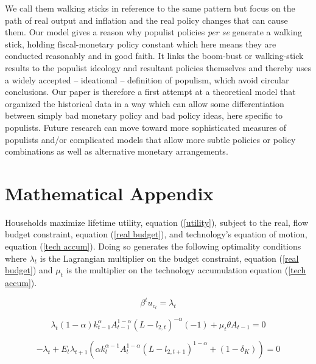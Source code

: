 \documentclass{OUP-EJ}
\begin{document}
We call them walking sticks in reference to the same pattern but focus on the path of real output and inflation and the real policy changes that can cause them. Our model gives a reason why populist policies \textit{per se} generate a walking stick, holding fiscal-monetary policy constant which here means they are conducted reasonably and in good faith. It links the boom-bust or walking-stick results to the populist ideology and resultant policies themselves and thereby uses a widely accepted – ideational – definition of populism, which avoid circular conclusions. Our paper is therefore a first attempt at a theoretical model that organized the historical data in a way which can allow some differentiation between simply bad monetary policy and bad policy ideas, here specific to populists.  Future research can move toward more sophisticated measures of populists and/or complicated models that allow more subtle policies or policy combinations as well as alternative monetary arrangements.




\appendix

\section{Mathematical Appendix}

Households maximize lifetime utility, equation (\ref{utility}), subject to the real, flow budget constraint, equation (\ref{real budget}), and technology's equation of motion, equation (\ref{tech accum}).  Doing so generates the following optimality conditions where $\lambda_t$ is the Lagrangian multiplier on the budget constraint, equation (\ref{real budget}) and $\mu_t$ is the multiplier on the technology accumulation equation (\ref{tech accum}).

\begin{equation}
    \label{L_c}
    \beta^t u_{c_t}=\lambda_t
\end{equation}

\begin{equation}
    \label{L_L2}
    \lambda_t (1-\alpha)k_{t-1}^{\alpha} A_{t-1}^{1-\alpha}(L-l_{2,t})^{-\alpha}(-1)+\mu_t \theta A_{t-1} = 0
\end{equation}

\begin{equation}
    \label{L_k}
    -\lambda_t + E_t \lambda_{t+1} (\alpha k_{t}^{\alpha-1}A_{t}^{1-\alpha}(L-l_{2,{t+1}})^{1-\alpha} +(1-\delta_K)) = 0
\end{equation}
\end{document}
